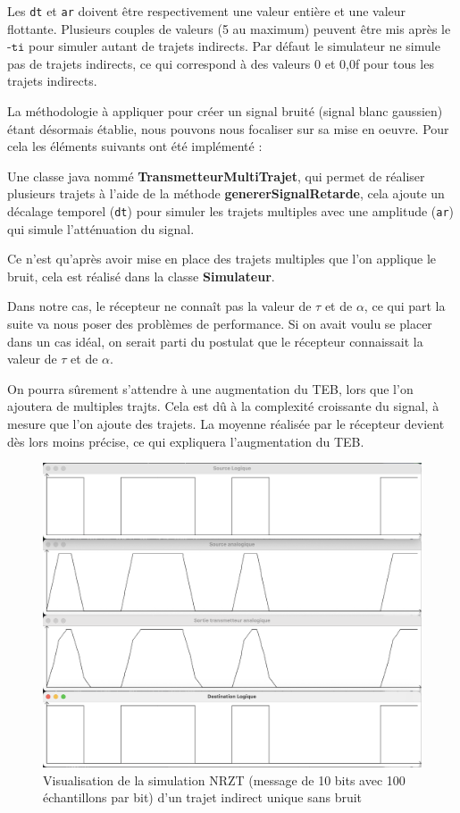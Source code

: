 \vspace{0,5cm}
Les \texttt{dt} et \texttt{ar} doivent être respectivement une valeur entière et une valeur flottante.
Plusieurs couples de valeurs (5 au maximum) peuvent être mis après le $\texttt{-ti}$ pour simuler autant de trajets indirects.
Par défaut le simulateur ne simule pas de trajets indirects, ce qui correspond à des valeurs 0 et 0,0f pour tous les trajets indirects.

La méthodologie à appliquer pour créer un signal bruité (signal blanc gaussien) étant désormais établie, nous pouvons nous focaliser sur sa mise en oeuvre. Pour cela les éléments suivants ont été implémenté :

Une classe java nommé \textbf{TransmetteurMultiTrajet}, qui permet de réaliser plusieurs trajets à l'aide de la méthode \textbf{genererSignalRetarde}, cela ajoute un décalage temporel (\texttt{dt}) pour simuler les trajets multiples avec une amplitude (\texttt{ar}) qui simule l'atténuation du signal. 

Ce n'est qu'après avoir mise en place des trajets multiples que l'on applique le bruit, cela est réalisé dans la classe \textbf{Simulateur}.

Dans notre cas, le récepteur ne connaît pas la valeur de $\tau$ et de $\alpha$, ce qui part la suite va nous poser des problèmes de performance. Si on avait voulu se placer dans un cas idéal, on serait parti du postulat que le récepteur connaissait la valeur de $\tau$ et de $\alpha$.

On pourra sûrement s'attendre à une augmentation du TEB, lors que l'on ajoutera de multiples trajts. Cela est dû à la complexité croissante du signal, à mesure que l'on ajoute des trajets. La moyenne réalisée par le récepteur devient dès lors moins précise, ce qui expliquera l'augmentation du TEB.


\begin{figure}[H]
    \centering
    \includegraphics[width=\textwidth]{img/etape4a_ti_seul.png}
    \caption{Visualisation de la simulation NRZT (message de 10 bits avec 100 échantillons par bit) d'un trajet indirect unique sans bruit}
    \label{fig:etape4a_ti_seul}
\end{figure}

